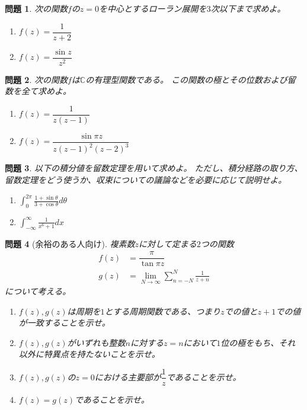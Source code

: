 \documentclass{ltjsarticle}
\newtheorem{prob}{問題}
\begin{document}
\begin{prob}
    次の関数$f$の$z=0$を中心とするローラン展開を$3$次以下まで求めよ。
    \begin{multicols}{2}
        \begin{enumerate}
            \item $f(z)=\dfrac{1}{z+2}$
            \item $f(z)=\dfrac{\sin z}{z^2}$
        \end{enumerate}
    \end{multicols}
\end{prob}

\begin{prob}
    次の関数$f$は$\mathbb{C}$の有理型関数である。
    この関数の極とその位数および留数を全て求めよ。
    \begin{multicols}{2}
        \begin{enumerate}
            \item $f(z)=\dfrac{1}{z(z-1)}$
            \item $f(z)=\dfrac{\sin\pi z}{z(z-1)^2(z-2)^3}$
        \end{enumerate}
    \end{multicols}
\end{prob}


\begin{prob}
    以下の積分値を留数定理を用いて求めよ。
    ただし、積分経路の取り方、留数定理をどう使うか、収束についての議論などを必要に応じて説明せよ。
    \begin{multicols}{2}
        \begin{enumerate}
            \item $\displaystyle\int^{2\pi}_0\frac{1+\sin\theta}{3+\cos\theta}d\theta$
            \item $\displaystyle\int^\infty_{-\infty}\frac{1}{x^6+1}dx$
        \end{enumerate}
    \end{multicols}
\end{prob}

\begin{prob}[余裕のある人向け]
    複素数$z$に対して定まる$2$つの関数
    \begin{align*}
        f(z)&=\dfrac{\pi}{\tan\pi z}\\
        g(z)&=\displaystyle\lim_{N\to\infty}\sum_{n=-N}^N\frac{1}{z+n}
    \end{align*}
    について考える。
    \begin{enumerate}
        \item $f(z), g(z)$は周期を$1$とする周期関数である、つまり$z$での値と$z+1$での値が一致することを示せ。
        \item $f(z), g(z)$がいずれも整数$n$に対する$z=n$において$1$位の極をもち、それ以外に特異点を持たないことを示せ。
        \item $f(z), g(z)$の$z=0$における主要部が$\dfrac{1}{z}$であることを示せ。
        \item $f(z)=g(z)$であることを示せ。
    \end{enumerate}
\end{prob}
\end{document}
